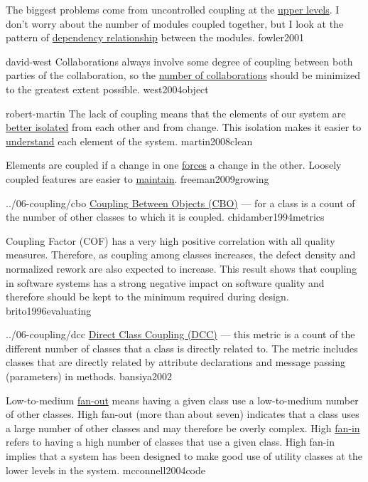 \documentclass{article}
\begin{document}
  {The biggest problems come from uncontrolled coupling at the \ul{upper levels}. I don't worry about the number of modules coupled together, but I look at the pattern of \ul{dependency relationship} between the modules.}
  {fowler2001}

\lnQuote
  {david-west}
  {Collaborations always involve some degree of coupling between both parties of the collaboration, so the \ul{number of collaborations} should be minimized to the greatest extent possible.}
  {west2004object}

\lnQuote
  {robert-martin}
  {The lack of coupling means that the elements of our system are \ul{better isolated} from each other and from change. This isolation makes it easier to \ul{understand} each element of the system.}
  {martin2008clean}

  {Elements are coupled if a change in one \ul{forces} a change in the other. Loosely coupled features are easier to \ul{maintain}.}
  {freeman2009growing}


\lnQuote
  {../06-coupling/cbo}
  {\ul{Coupling Between Objects (CBO)} --- for a class is a count of the number of other classes to which it is coupled.}
  {chidamber1994metrics}

  {Coupling Factor (COF) has a very high positive correlation with all quality measures. Therefore, as coupling among classes increases, the defect density and normalized rework are also expected to increase. This result shows that coupling in software systems has a strong negative impact on software quality and therefore should be kept to the minimum required during design.}
  {brito1996evaluating}

\lnQuote
  {../06-coupling/dcc}
  {\ul{Direct Class Coupling (DCC)} --- this metric is a count of the different number of classes that a class is directly related to. The metric includes classes that are directly related by attribute declarations and message passing (parameters) in methods.}
  {bansiya2002}

  {Low-to-medium \ul{fan-out} means having a given class use a low-to-medium number of other classes. High fan-out (more than about seven) indicates that a class uses a large number of other classes and may therefore be overly complex. High \ul{fan-in} refers to having a high number of classes that use a given class. High fan-in implies that a system has been designed to make good use of utility classes at the lower levels in the system.}
  {mcconnell2004code}
\end{document}
